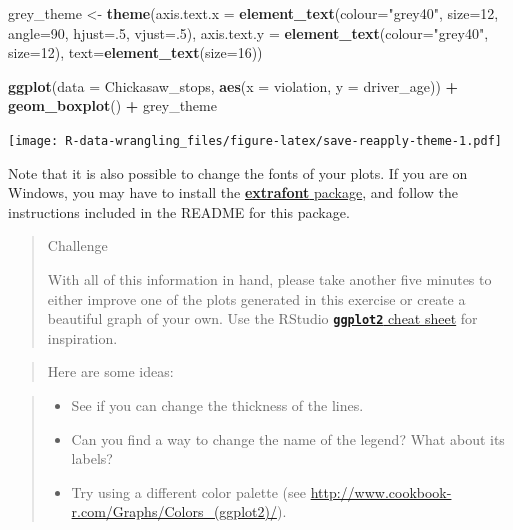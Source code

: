 \documentclass[]{book}
\newenvironment{Shaded}{\begin{snugshade}}{\end{snugshade}}
\newcommand{\KeywordTok}[1]{\textcolor[rgb]{0.13,0.29,0.53}{\textbf{#1}}}
\newcommand{\DataTypeTok}[1]{\textcolor[rgb]{0.13,0.29,0.53}{#1}}
\newcommand{\DecValTok}[1]{\textcolor[rgb]{0.00,0.00,0.81}{#1}}
\newcommand{\StringTok}[1]{\textcolor[rgb]{0.31,0.60,0.02}{#1}}
\newcommand{\OperatorTok}[1]{\textcolor[rgb]{0.81,0.36,0.00}{\textbf{#1}}}
\newcommand{\NormalTok}[1]{#1}
\providecommand{\tightlist}{%
  \setlength{\itemsep}{0pt}\setlength{\parskip}{0pt}}
\theoremstyle{definition}
\theoremstyle{definition}
\theoremstyle{definition}
\theoremstyle{remark}
\begin{document}
\begin{Shaded}
\begin{Highlighting}[]
\NormalTok{grey_theme <-}\StringTok{ }\KeywordTok{theme}\NormalTok{(}\DataTypeTok{axis.text.x =} \KeywordTok{element_text}\NormalTok{(}\DataTypeTok{colour=}\StringTok{"grey40"}\NormalTok{, }\DataTypeTok{size=}\DecValTok{12}\NormalTok{, }\DataTypeTok{angle=}\DecValTok{90}\NormalTok{, }\DataTypeTok{hjust=}\NormalTok{.}\DecValTok{5}\NormalTok{, }\DataTypeTok{vjust=}\NormalTok{.}\DecValTok{5}\NormalTok{),}
                   \DataTypeTok{axis.text.y =} \KeywordTok{element_text}\NormalTok{(}\DataTypeTok{colour=}\StringTok{"grey40"}\NormalTok{, }\DataTypeTok{size=}\DecValTok{12}\NormalTok{), }\DataTypeTok{text=}\KeywordTok{element_text}\NormalTok{(}\DataTypeTok{size=}\DecValTok{16}\NormalTok{))}

\KeywordTok{ggplot}\NormalTok{(}\DataTypeTok{data =}\NormalTok{ Chickasaw_stops, }\KeywordTok{aes}\NormalTok{(}\DataTypeTok{x =}\NormalTok{ violation, }\DataTypeTok{y =}\NormalTok{ driver_age)) }\OperatorTok{+}
\StringTok{  }\KeywordTok{geom_boxplot}\NormalTok{() }\OperatorTok{+}\StringTok{ }
\StringTok{  }\NormalTok{grey_theme}
\end{Highlighting}
\end{Shaded}

\texttt{[image: R-data-wrangling\_files/figure-latex/save-reapply-theme-1.pdf]}

Note that it is also possible to change the fonts of your plots. If you
are on Windows, you may have to install the
\href{https://github.com/wch/extrafont}{\textbf{extrafont} package}, and
follow the instructions included in the README for this package.

\begin{quote}
Challenge

With all of this information in hand, please take another five minutes
to either improve one of the plots generated in this exercise or create
a beautiful graph of your own. Use the RStudio
\href{https://www.rstudio.com/wp-content/uploads/2016/11/ggplot2-cheatsheet-2.1.pdf}{\textbf{\texttt{ggplot2}}
cheat sheet} for inspiration.
\end{quote}

\begin{quote}
Here are some ideas:
\end{quote}

\begin{quote}
\begin{itemize}
\tightlist
\item
  See if you can change the thickness of the lines.
\item
  Can you find a way to change the name of the legend? What about its
  labels?
\item
  Try using a different color palette (see
  \url{http://www.cookbook-r.com/Graphs/Colors_(ggplot2)/}).
\end{itemize}
\end{quote}
\end{document}
